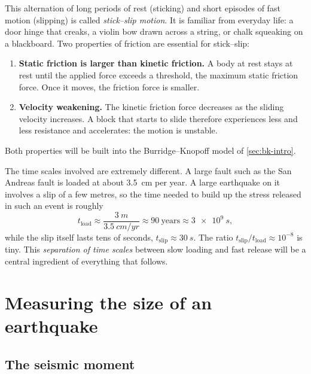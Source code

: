 This alternation of long periods of rest (sticking) and short episodes of fast motion
(slipping) is called \emph{stick--slip motion}. It is familiar from everyday life: a door
hinge that creaks, a violin bow drawn across a string, or chalk squeaking on a blackboard. Two
properties of friction are essential for stick--slip:
\begin{enumerate}[nosep]
  \item \textbf{Static friction is larger than kinetic friction.} A body at rest stays at
    rest until the applied force exceeds a threshold, the maximum static friction force.
    Once it moves, the friction force is smaller.
  \item \textbf{Velocity weakening.} The kinetic friction force decreases as the sliding
    velocity increases. A block that starts to slide therefore experiences less and less
    resistance and accelerates: the motion is unstable.
\end{enumerate}
Both properties will be built into the Burridge--Knopoff model of \cref{sec:bk-intro}.

The time scales involved are extremely different. A large fault such as the San Andreas fault
is loaded at about \SI{3.5}{cm} per year. A large earthquake on it involves a slip of a few
metres, so the time needed to build up the stress released in such an event is roughly
\begin{equation}
  t_{\text{load}} \approx \frac{\SI{3}{m}}{\SI{3.5}{cm/yr}} \approx 90\ \text{years}
  \approx \SI{3e9}{s},
\end{equation}
while the slip itself lasts tens of seconds, $t_{\text{slip}}\approx\SI{30}{s}$. The ratio
$t_{\text{slip}}/t_{\text{load}}\approx 10^{-8}$ is tiny. This \emph{separation of time scales}
between slow loading and fast release will be a central ingredient of everything that follows.

\section{Measuring the size of an earthquake}
\label{sec:moment}

\subsection{The seismic moment}

